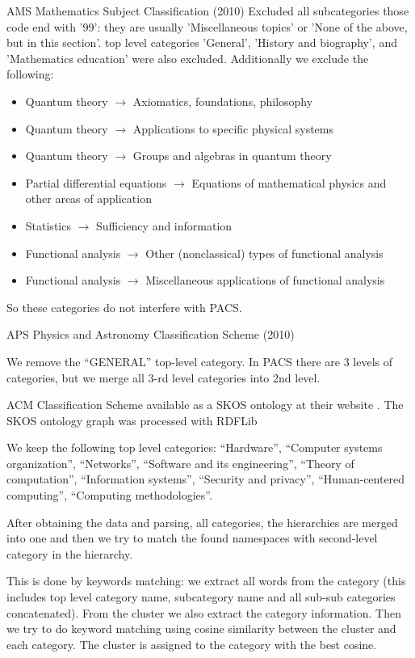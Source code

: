AMS Mathematics Subject Classification (2010) \cite{ams2010msc}
Excluded all subcategories those code end with '99': they are 
usually 'Miscellaneous topics' or 'None of the above, but in this section'. 
top level categories 'General', 'History and biography', and 'Mathematics education'
were also excluded. 
Additionally we exclude the following: 

\begin{itemize}
\item Quantum theory $\to$ Axiomatics, foundations, philosophy
\item Quantum theory $\to$ Applications to specific physical systems
\item Quantum theory $\to$ Groups and algebras in quantum theory
\item Partial differential equations $\to$ Equations of mathematical physics and other areas of application
\item Statistics $\to$ Sufficiency and information
\item Functional analysis $\to$ Other (nonclassical) types of functional analysis
\item Functional analysis $\to$ Miscellaneous applications of functional analysis
\end{itemize}

So these categories do not interfere with PACS. 


APS Physics and Astronomy Classification Scheme (2010) \cite{aps2010pacs}

We remove the ``GENERAL'' top-level category. 
In PACS there are 3 levels of categories, but we merge all 3-rd level categories into 
2nd level.

ACM Classification Scheme \cite{rous2012acm} available as a SKOS \cite{miles2005skos} ontology 
at their website \cite{amc2012ccs}. The SKOS ontology graph was processed with RDFLib \cite{rdflib}

We keep the following top level categories:
``Hardware'', ``Computer systems organization'', ``Networks'', 
``Software and its engineering'', ``Theory of computation'', 
``Information systems'', ``Security and privacy'',
``Human-centered computing'', ``Computing methodologies''.

After obtaining the data and parsing, all categories, the hierarchies 
are merged into one and then we try to match the found namespaces 
with second-level category in the hierarchy. 

This is done by keywords matching: we extract all words from the 
category (this includes top level category name, subcategory name
and all sub-sub categories concatenated). From the cluster 
we also extract the category information.
Then we try to do keyword matching using cosine similarity 
between the cluster and each category. The cluster is assigned 
to the category with the best cosine. 

